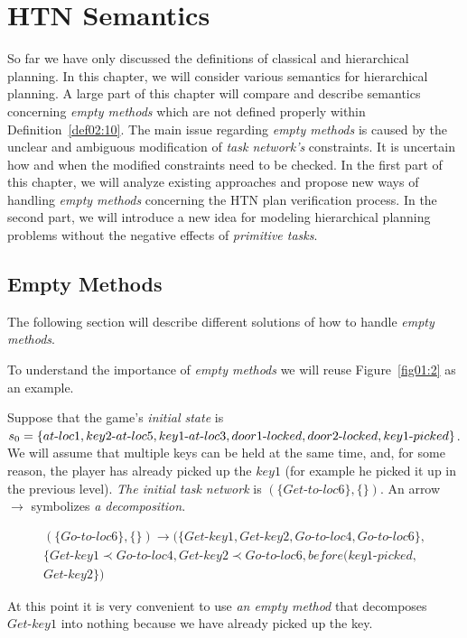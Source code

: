 \chapter{{HTN} Semantics}

\medskip\noindent
So far we have only discussed the definitions of classical and hierarchical planning. In this chapter, we will consider various semantics for hierarchical planning. A large part of this chapter will compare and describe semantics concerning \emph{empty methods} which are not defined properly within Definition~\ref{def02:10}. The main issue regarding \emph{empty methods} is caused by the unclear and ambiguous modification of \emph{task network's} constraints. It is uncertain how and when the modified constraints need to be checked. In the first part of this chapter, we will analyze existing approaches and propose new ways of handling \emph{empty methods} concerning the HTN plan verification process. In the second part, we will introduce a new idea for modeling hierarchical planning problems without the negative effects of \emph{primitive tasks}.

\section{Empty Methods}

\medskip\noindent
The following section will describe different solutions of how to handle \emph{empty methods}.

\begin{example}\label{ex03:5}
    To understand the importance of \emph{empty methods} we will reuse Figure~\ref{fig01:2} as an example.

    Suppose that the game's \emph{initial state} is $s_0 = \{at\text{-}loc1, key2\text{-}at\text{-}loc5, \\ key1\text{-}at\text{-}loc3, door1\text{-}locked, door2\text{-}locked, key1\text{-}picked\}$. We will assume that multiple keys can be held at the same time, and, for some reason, the player has already picked up the $key1$ (for example he picked it up in the previous level). \emph{The initial task network} is $(\{Get\text{-}to\text{-}loc6\}, \{\})$. An arrow $\rightarrow$ symbolizes \emph{a decomposition}.

    \begin{gather*}
       (\{Go\text{-}to\text{-}loc6\}, \{\}) \rightarrow (\{Get\text{-}key1, Get\text{-}key2, Go\text{-}to\text{-}loc4, Go\text{-}to\text{-}loc6\}, \\ \{Get\text{-}key1 \prec Go\text{-}to\text{-}loc4, Get\text{-}key2 \prec Go\text{-}to\text{-}loc6, before(key1\text{-}picked, \\ Get\text{-}key2\})
    \end{gather*}

    At this point it is very convenient to use \emph{an empty method} that decomposes $Get\text{-}key1$ into nothing because we have already picked up the key.
\end{example}


